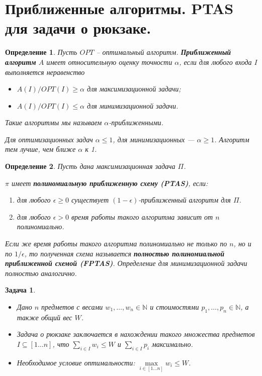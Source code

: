 \documentclass[a4paper,12pt]{article}
\newtheorem*{on1n}{Задача}
\newtheorem*{definition}{Определение}
\newcommand{\N}{\mathbb{N}}
\begin{document}
\section{Приближенные алгоритмы. PTAS для задачи о рюкзаке.}
\begin{definition}
Пусть $OPT$ -- оптимальный алгоритм. \textbf{Приближенный алгоритм} $A$ имеет относительную оценку точности
$\alpha$, если для любого входа $I$
выполняется неравенство
\begin{itemize}
    \item $A(I)\slash OPT(I) \geqslant \alpha$ для максимизационной задачи;
    \item $A(I)/OPT(I)\leqslant \alpha$ для минимизационной задачи.
\end{itemize}
Такие алгоритмы мы называем $\alpha$-приближенными.

Для оптимизационных задач $\alpha \leqslant 1$, для минимизационных — $\alpha \geqslant 1$.
Алгоритм тем лучше, чем ближе $\alpha$ к 1.
\end{definition}
\begin{definition}
Пусть дана максимизационная задача $\Pi$.

$\pi$ имеет \textbf{полиномиальную приближенную схему} \textbf{(PTAS)}, если:
\begin{enumerate}
    \item для любого $\epsilon \geqslant 0$ существует $(1 - \epsilon)$-приближенный алгоритм для $\Pi$.
    \item для любого $\epsilon > 0$ время работы такого алгоритма зависит от $n$ полиномиально.
\end{enumerate}
Если же время работы такого алгоритма полиномиально не
только по $n$, но и по $1\slash\epsilon$, то полученная схема называется
\textbf{полностью полиномиальной приближенной схемой (FPTAS)}.
Определение для минимизационной задачи полностью
аналогично.
\end{definition}
\begin{on1n}
\begin{itemize}
    \item Дано $n$ предметов с весами $w_1, \ldots , w_n \in \N$ и стоимостями     $p_1, \ldots, p_n \in \N$, а также общий вес $W$.
    \item Задача о рюкзаке заключается в нахождении такого множества предметов $I \subseteq [1\ldots n]$, что $\sum\limits_{i \in I}w_i \leqslant W$ и $\sum\limits_{i \in I}p_i$ максимально.
    \item Необходимое условие оптимальности: $\max\limits_{i \in [1\ldots n]}w_i \leqslant W$.
\end{itemize}
\end{on1n}
\end{document}
